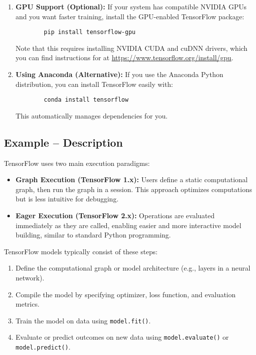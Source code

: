 \begin{enumerate}
	\item \textbf{GPU Support (Optional):}  
	If your system has compatible NVIDIA GPUs and you want faster training, install the GPU-enabled TensorFlow package:
	\begin{framed}
	\begin{verbatim}
		pip install tensorflow-gpu
	\end{verbatim}
\end{framed}
	Note that this requires installing NVIDIA CUDA and cuDNN drivers, which you can find instructions for at \url{https://www.tensorflow.org/install/gpu}.
	
	\item \textbf{Using Anaconda (Alternative):}  
	If you use the Anaconda Python distribution, you can install TensorFlow easily with:
	\begin{framed}
	\begin{verbatim}
		conda install tensorflow
	\end{verbatim}
\end{framed}
	This automatically manages dependencies for you.
\end{enumerate}




\subsection{Example -- Description}
TensorFlow uses two main execution paradigms:

\begin{itemize}
	\item \textbf{Graph Execution (TensorFlow 1.x):} Users define a static computational graph, then run the graph in a session. This approach optimizes computations but is less intuitive for debugging.
	\item \textbf{Eager Execution (TensorFlow 2.x):} Operations are evaluated immediately as they are called, enabling easier and more interactive model building, similar to standard Python programming.
\end{itemize}

TensorFlow models typically consist of these steps:
\begin{enumerate}
	\item Define the computational graph or model architecture (e.g., layers in a neural network).
	\item Compile the model by specifying optimizer, loss function, and evaluation metrics.
	\item Train the model on data using \texttt{model.fit()}.
	\item Evaluate or predict outcomes on new data using \texttt{model.evaluate()} or \texttt{model.predict()}.
\end{enumerate}

